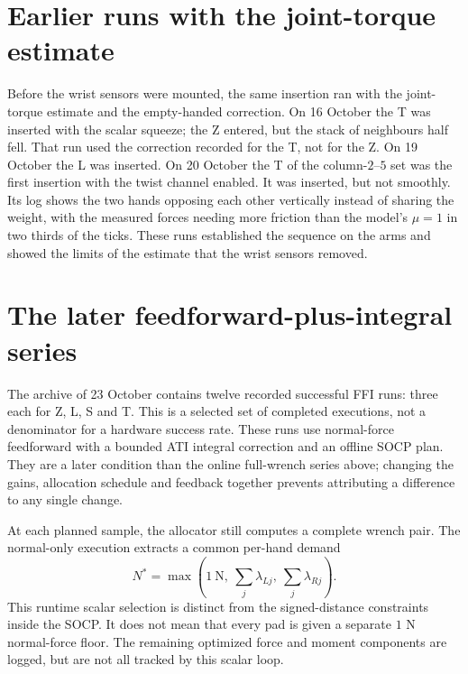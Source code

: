 \section{Earlier runs with the joint-torque estimate}

Before the wrist sensors were mounted, the same insertion ran with the joint-torque estimate and the empty-handed correction. On 16 October the T was inserted with the scalar squeeze; the Z entered, but the stack of neighbours half fell. That run used the correction recorded for the T, not for the Z. On 19 October the L was inserted. On 20 October the T of the column-$2$--$5$ set was the first insertion with the twist channel enabled. It was inserted, but not smoothly. Its log shows the two hands opposing each other vertically instead of sharing the weight, with the measured forces needing more friction than the model's $\mu=1$ in two thirds of the ticks. These runs established the sequence on the arms and showed the limits of the estimate that the wrist sensors removed.

\section{The later feedforward-plus-integral series}
\label{sec:kinova-ffi}

The archive of 23 October contains twelve recorded successful FFI runs: three each for Z, L, S and T. This is a selected set of completed executions, not a denominator for a hardware success rate. These runs use normal-force feedforward with a bounded ATI integral correction and an offline SOCP plan. They are a later condition than the online full-wrench series above; changing the gains, allocation schedule and feedback together prevents attributing a difference to any single change.

At each planned sample, the allocator still computes a complete wrench pair. The normal-only execution extracts a common per-hand demand
\begin{equation}
N^*=\max\left(1\ \mathrm{N},\ \sum_j\lambda_{Lj},\ \sum_j\lambda_{Rj}\right).
\end{equation}
This runtime scalar selection is distinct from the signed-distance constraints inside the SOCP. It does not mean that every pad is given a separate $1$ N normal-force floor. The remaining optimized force and moment components are logged, but are not all tracked by this scalar loop.

